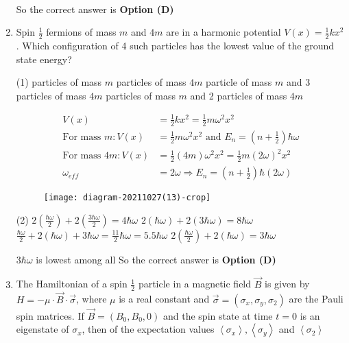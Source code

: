 \begin{enumerate}
\begin{answer}
\begin{align*}
\end{align*}
So the correct answer is \textbf{Option (D)}
\end{answer}	
\item Spin $\frac{1}{2}$ fermions of mass $m$ and $4 m$ are in a harmonic potential $V(x)=\frac{1}{2} k x^{2}$. Which configuration of 4 such particles has the lowest value of the ground state energy?
{}
\begin{tasks}(1)
 particles of mass $m$
 particles of mass $4 m$
 particle of mass $m$ and 3 particles of mass $4 m$
 particles of mass $m$ and 2 particles of mass $4 m$
\end{tasks}
\begin{answer}
\begin{align*}
V(x)&=\frac{1}{2} k x^{2}=\frac{1}{2} m \omega^{2} x^{2}\\
\text{For mass }m: V(x)&=\frac{1}{2} m \omega^{2} x^{2}\text{ and } E_{n}=\left(n+\frac{1}{2}\right) \hbar \omega\\
\text{For mass }4 m: V(x)&=\frac{1}{2}(4 m) \omega^{2} x^{2}=\frac{1}{2} m(2 \omega)^{2} x^{2}\\
\omega_{e f f}&=2 \omega \Rightarrow E_{n}=\left(n+\frac{1}{2}\right) \hbar(2 \omega)
\end{align*}
\begin{figure}[H]
	\centering
	\texttt{[image: diagram-20211027(13)-crop]}
\end{figure}
\begin{tasks}(2)
	\task[\textbf{A.}] $2\left(\frac{\hbar \omega}{2}\right)+2\left(\frac{3 \hbar \omega}{2}\right)=4 \hbar \omega$
	\task[\textbf{B.}]  $2(\hbar \omega)+2(3 \hbar \omega)=8 \hbar \omega$
	\task[\textbf{C.}] $\frac{\hbar \omega}{2}+2(\hbar \omega)+3 \hbar \omega=\frac{11}{2} \hbar \omega=5.5 \hbar \omega$
	\task[\textbf{D.}] $2\left(\frac{\hbar \omega}{2}\right)+2(\hbar \omega)=3 \hbar \omega$
\end{tasks}
$3 \hbar \omega$ is lowest among all 
So the correct answer is \textbf{Option (D)}
\end{answer}	
\item The Hamiltonian of a spin $\frac{1}{2}$ particle in a magnetic field $\vec{B}$ is given by $H=-\mu \cdot \vec{B} \cdot \vec{\sigma}$, where $\mu$ is a real constant and $\vec{\sigma}=\left(\sigma_{x}, \sigma_{y}, \sigma_{2}\right)$ are the Pauli spin matrices. If $\vec{B}=\left(B_{0}, B_{0}, 0\right)$ and the spin state at time $t=0$ is an eigenstate of $\sigma_{x}$, then of the expectation values $\left\langle\sigma_{x}\right\rangle,\left\langle\sigma_{y}\right\rangle$ and $\left\langle\sigma_{2}\right\rangle$

\end{enumerate}
